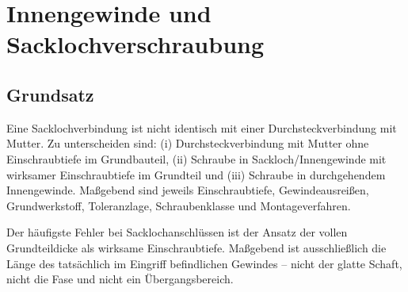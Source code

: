 \documentclass[10pt,a4paper]{article}
\begin{document}
\section{Innengewinde und Sacklochverschraubung}

\subsection{Grundsatz}
Eine Sacklochverbindung ist nicht identisch mit einer Durchsteckverbindung mit Mutter. Zu unterscheiden sind: (i) Durchsteckverbindung mit Mutter ohne Einschraubtiefe im Grundbauteil, (ii) Schraube in Sackloch/Innengewinde mit wirksamer Einschraubtiefe im Grundteil und (iii) Schraube in durchgehendem Innengewinde. Maßgebend sind jeweils Einschraubtiefe, Gewindeausreißen, Grundwerkstoff, Toleranzlage, Schraubenklasse und Montageverfahren.

Der häufigste Fehler bei Sacklochanschlüssen ist der Ansatz der vollen Grundteildicke als wirksame Einschraubtiefe. Maßgebend ist ausschließlich die Länge des tatsächlich im Eingriff befindlichen Gewindes -- nicht der glatte Schaft, nicht die Fase und nicht ein Übergangsbereich.
\end{document}

